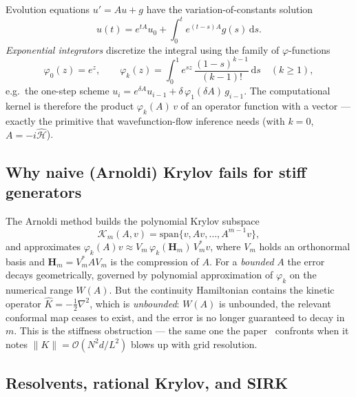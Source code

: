 \documentclass[11pt, a4paper]{article}
\newcommand{\Hgen}{\hat{\mathcal{H}}}
\newcommand{\Kry}{\mathcal{K}}
\newcommand{\Kop}{\hat{K}}
\begin{document}
Evolution equations $u'=Au+g$ have the variation-of-constants solution
\begin{equation}
  u(t)=e^{tA}u_0+\int_0^t e^{(t-s)A}g(s)\,\mathrm{d}s .
\end{equation}
\emph{Exponential integrators} discretize the integral using the family of
$\varphi$-functions
\begin{equation}
  \varphi_0(z)=e^z,\qquad
  \varphi_k(z)=\int_0^1 e^{sz}\,\frac{(1-s)^{k-1}}{(k-1)!}\,\mathrm{d}s
  \quad(k\ge 1),
\end{equation}
e.g.\ the one-step scheme $u_i=e^{\delta A}u_{i-1}+\delta\,\varphi_1(\delta
A)\,g_{i-1}$. The computational kernel is therefore the product
$\varphi_k(A)\,v$ of an operator function with a vector --- exactly the
primitive that wavefunction-flow inference needs (with $k=0$, $A=-i\Hgen$).

\subsection{Why naive (Arnoldi) Krylov fails for stiff generators}

The Arnoldi method builds the polynomial Krylov subspace
\begin{equation}
  \Kry_m(A,v)=\mathrm{span}\{v,Av,\dots,A^{m-1}v\},
\end{equation}
and approximates $\varphi_k(A)v\approx V_m\,\varphi_k(\mathbf{H}_m)\,V_m^*v$,
where $V_m$ holds an orthonormal basis and
$\mathbf{H}_m=V_m^*AV_m$ is the compression of $A$. For a \emph{bounded} $A$
the error decays geometrically, governed by polynomial approximation of
$\varphi_k$ on the numerical range $W(A)$. But the continuity Hamiltonian
contains the kinetic operator $\Kop=-\tfrac12\nabla^2$, which is
\emph{unbounded}: $W(A)$ is unbounded, the relevant conformal map ceases to
exist, and the error is no longer guaranteed to decay in $m$. This is the
stiffness obstruction --- the same one the paper~\cite{Layden2025} confronts
when it notes $\|K\|=\mathcal{O}(N^2 d/L^2)$ blows up with grid resolution.

\subsection{Resolvents, rational Krylov, and SIRK}
\end{document}
